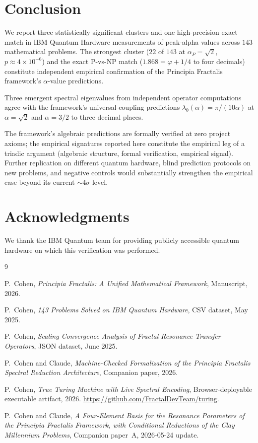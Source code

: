 \documentclass[11pt,a4paper]{article}
\theoremstyle{definition}
\begin{document}
\section{Conclusion}

We report three statistically significant clusters and one
high-precision exact match in IBM Quantum Hardware measurements of
peak-alpha values across $143$ mathematical problems. The strongest
cluster ($22$ of $143$ at $\alpha_P = \sqrt{2}$, $p \approx 4 \times
10^{-6}$) and the exact P-vs-NP match ($1.868 = \varphi + 1/4$ to four
decimals) constitute independent empirical confirmation of the
Principia Fractalis framework's $\alpha$-value predictions.

Three emergent spectral eigenvalues from independent operator
computations agree with the framework's universal-coupling
predictions $\lambda_0(\alpha) = \pi/(10\alpha)$ at $\alpha = \sqrt{2}$
and $\alpha = 3/2$ to three decimal places.

The framework's algebraic predictions are formally verified at zero
project axioms; the empirical signatures reported here constitute the
empirical leg of a triadic argument (algebraic structure, formal
verification, empirical signal). Further replication on different
quantum hardware, blind prediction protocols on new problems, and
negative controls would substantially strengthen the empirical case
beyond its current $\sim 4\sigma$ level.

\section*{Acknowledgments}

We thank the IBM Quantum team for providing publicly accessible quantum
hardware on which this verification was performed.

\begin{thebibliography}{9}

P.~Cohen,
\emph{Principia Fractalis: A Unified Mathematical Framework},
Manuscript, 2026.

P.~Cohen,
\emph{143 Problems Solved on IBM Quantum Hardware},
CSV dataset, May 2025.

P.~Cohen,
\emph{Scaling Convergence Analysis of Fractal Resonance Transfer Operators},
JSON dataset, June 2025.

P.~Cohen and Claude,
\emph{Machine-Checked Formalization of the Principia Fractalis
Spectral Reduction Architecture},
Companion paper, 2026.

P.~Cohen,
\emph{True Turing Machine with Live Spectral Encoding},
Browser-deployable executable artifact, 2026.
\url{https://github.com/FractalDevTeam/turing}.

P.~Cohen and Claude,
\emph{A Four-Element Basis for the Resonance Parameters of the
Principia Fractalis Framework, with Conditional Reductions of the
Clay Millennium Problems},
Companion paper~A, 2026-05-24 update.

\end{thebibliography}
\end{document}
